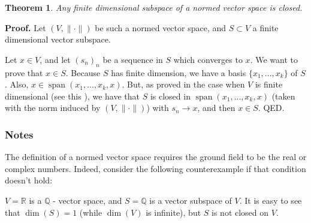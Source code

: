 \documentclass[12pt]{article}
\begin{document}
\newtheorem{thm}{Theorem}
\begin{thm}
Any finite dimensional subspace of a normed vector space is closed.
\end{thm}

\textbf{Proof.} Let $(V, \| \cdot \|)$ be such a normed vector space, and $S \subset V$ a finite dimensional vector subspace.

Let $x \in V$, and let $(s_n)_n$ be a sequence in $S$ which converges to $x$. We want to prove that $x \in S$. Because $S$ has finite dimension, we have a basis $\{x_{1}, ..., x_{k}\}$ of $S$. Also, $x \in \operatorname{span}(x_{1}, ..., x_{k}, x)$. But, as proved in the case when $V$ is finite dimensional (see this  ), we have that $S$ is closed in $\operatorname{span}(x_{1}, ..., x_{k}, x)$ (taken with the norm induced by $(V, \| \cdot \|)$) with $s_{n} \rightarrow x$, and then $x \in S$. QED.

\subsubsection{Notes}
The definition of a normed vector space requires the   ground field to be  the real or complex numbers. Indeed, consider the following counterexample if that condition doesn't hold:

$V = \mathbb{R}$ is a $\mathbb{Q}$ - vector space, and $S = \mathbb{Q}$ is a vector subspace of $V$. It is easy to see that $\dim(S) = 1$ (while $\dim(V)$ is infinite), but $S$ is not closed on $V$.
\end{document}
